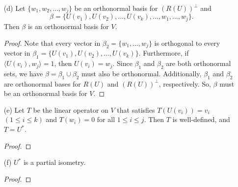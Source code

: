 \begin{enumerate}
\begin{proof}
        \end{proof}
    \item[(d)] Let \( \{ {w}_{1}, {w}_{2}, \dots, {w}_{j} \}   \)  be an orthonormal basis for \( (R(U))^{\perp} \) and 
        \[ \beta = \{ U({v}_{1}), U({v}_{2}), \dots, U({v}_{k}), \dots, {w}_{1}, \dots, {w}_{j} \}. \] Then \( \beta  \) is an orthonormal basis for \( V  \).
        \begin{proof}
        Note that every vector in  \( {\beta}_{2} =  \{ {w}_{1}, \dots, {w}_{j} \} \) is orthogonal to every vector in \( {\beta}_{1} = \{ U({v}_{1}), U({v}_{2}), \dots, U({v}_{k}) \}  \). Furthermore, if \( \langle U({v}_{i}) ,  {w}_{j} \rangle = 1  \), then \( U({v}_{i}) = {w}_{j} \). Since \( {\beta}_{1} \) and \( {\beta}_{2} \) are both orthonormal sets, we have \( \beta = {\beta}_{1} \cup {\beta}_{2} \) must also be orthonormal. Additionally, \( {\beta}_{1}  \) and \( {\beta}_{2}  \) are orthonormal bases for \( R(U) \) and \( (R(U))^{\perp} \), respectively. So, \(  \beta   \) must be an orthonormal basis for \( V  \).     
        \end{proof}
    \item[(e)] Let \( T  \) be the linear operator on \( V  \) that satisfies \( T(U({v}_{i})) = {v}_{i} \) \( (1 \leq i \leq k) \) and \( T({w}_{i}) = 0  \) for all \( 1 \leq i \leq j  \). Then \( T  \) is well-defined, and \( T = U^{*} \).
        \begin{proof}
        
        \end{proof}
    \item[(f)] \( U^{*} \) is a partial isometry.
        \begin{proof}
        
        \end{proof}
\end{enumerate}

